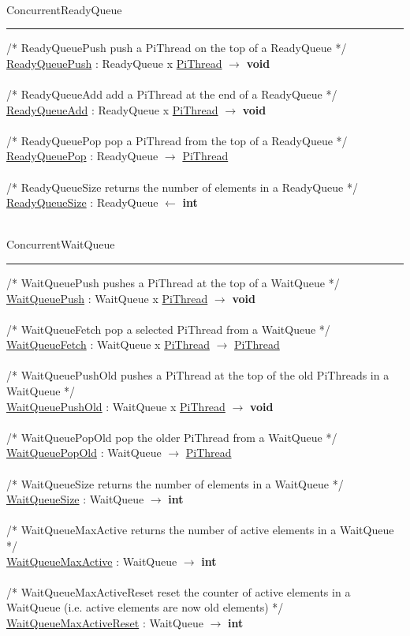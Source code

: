 \documentclass[a4paper,11pt]{article}
\newenvironment{program}{
  \begin{sffamily}
  \begin{scriptsize}
  \begin{tabbing}}
 {\end{tabbing}
  \end{scriptsize}
  \end{sffamily}}
\newcommand{\kw}[1]{\textsf{\textbf{#1}}}
\newcommand{\algotitle}[1]{\noindent\\ \noindent#1\par\nobreak\vspace{3pt}\hrule\vspace{6pt}}
\newcommand{\algosection}[1]{
  \phantomsection
  \algotitle{#1}
}
\newcommand{\myref}[1]{
  \hyperref[#1]{#1}
}
\begin{document}
\algosection{ConcurrentReadyQueue}
\begin{program}
  /* ReadyQueuePush push a PiThread on the top of a ReadyQueue */ \\
  \myref{ReadyQueuePush} : ReadyQueue x \myref{PiThread} $\rightarrow$ \kw{void} \\ \\
  /* ReadyQueueAdd add a PiThread at the end of a ReadyQueue */ \\
  \myref{ReadyQueueAdd} : ReadyQueue x \myref{PiThread} $\rightarrow$ \kw{void} \\ \\
  /* ReadyQueuePop pop a PiThread from the top of a ReadyQueue */ \\
  \myref{ReadyQueuePop} : ReadyQueue $\rightarrow$ \myref{PiThread} \\ \\
  /* ReadyQueueSize returns the number of elements in a ReadyQueue */ \\
  \myref{ReadyQueueSize} : ReadyQueue $\leftarrow$ \kw{int}
\end{program}

\algosection{ConcurrentWaitQueue}
\begin{program}
  /* WaitQueuePush pushes a PiThread at the top of a WaitQueue */ \\
  \myref{WaitQueuePush} : WaitQueue x \myref{PiThread} $\rightarrow$ \kw{void} \\ \\
  /* WaitQueueFetch pop a selected PiThread from a WaitQueue */ \\
  \myref{WaitQueueFetch} : WaitQueue x \myref{PiThread} $\rightarrow$ \myref{PiThread} \\ \\
  /* WaitQueuePushOld pushes a PiThread at the top of the old PiThreads in a WaitQueue */ \\
  \myref{WaitQueuePushOld} : WaitQueue x \myref{PiThread} $\rightarrow$ \kw{void} \\ \\
  /* WaitQueuePopOld pop the older PiThread from a WaitQueue */ \\
  \myref{WaitQueuePopOld} : WaitQueue $\rightarrow$ \myref{PiThread} \\ \\
  /* WaitQueueSize returns the number of elements in a WaitQueue */ \\
  \myref{WaitQueueSize} : WaitQueue $\rightarrow$ \kw{int} \\ \\
  /* WaitQueueMaxActive returns the number of active elements in a WaitQueue */ \\
  \myref{WaitQueueMaxActive} : WaitQueue $\rightarrow$ \kw{int} \\ \\
  /* WaitQueueMaxActiveReset reset the counter of active elements in a WaitQueue (i.e. active elements are now old elements) */ \\
  \myref{WaitQueueMaxActiveReset} : WaitQueue $\rightarrow$ \kw{int}
\end{program}
\end{document}
